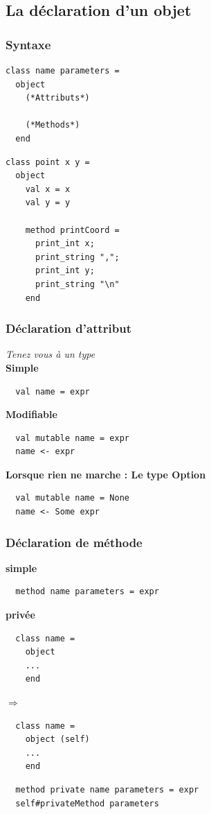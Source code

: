 \subsection{La déclaration d'un objet} %
\begin{frame}[fragile]
	\frametitle{Syntaxe}
	\begin{minipage}{0.45\textwidth}
		\lstset{basicstyle=\small}
		\begin{lstlisting}
class name parameters =
  object
    (*Attributs*)
    
    (*Methods*)
  end
		\end{lstlisting}
	\end{minipage}
	\begin{minipage}{0.4\textwidth}
		\begin{lstlisting}
class point x y =
  object
    val x = x
    val y = y

    method printCoord =
      print_int x;
      print_string ",";
      print_int y;
      print_string "\n"
    end
		\end{lstlisting}
	\end{minipage}
\end{frame}

\begin{frame}[fragile]
	\frametitle{Déclaration d'attribut}
	\textit{Tenez vous à un type}\\
	\textbf{Simple}
	\begin{lstlisting}
  val name = expr
	\end{lstlisting}
	\textbf{Modifiable}
	\begin{lstlisting}
  val mutable name = expr
  name <- expr
	\end{lstlisting}
	\textbf{Lorsque rien ne marche : Le type Option}
	\begin{lstlisting}
  val mutable name = None
  name <- Some expr
	\end{lstlisting}
\end{frame}

\begin{frame}[fragile]
	\frametitle{Déclaration de méthode}
	\textbf{simple}
	\begin{lstlisting}
  method name parameters = expr
	\end{lstlisting}
	\textbf{privée}\\
	\begin{minipage}{0.4\textwidth}
  	\begin{lstlisting}
  class name =
    object
    ...
    end
		\end{lstlisting}
	\end{minipage}$\Rightarrow$
	\begin{minipage}{0.4\textwidth}
		\begin{lstlisting}
  class name =
    object (self)
    ...
    end
		\end{lstlisting}
	\end{minipage}
	\begin{lstlisting}
  method private name parameters = expr
  self#privateMethod parameters
	\end{lstlisting}
\end{frame}

